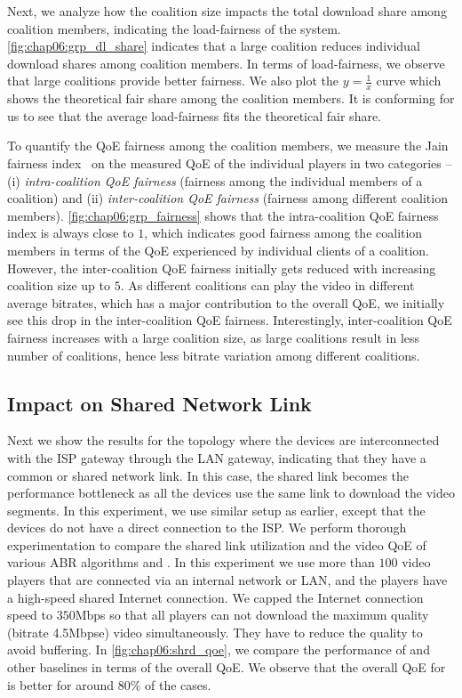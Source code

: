 Next, we analyze how the coalition size impacts the total download share among coalition members, indicating the load-fairness of the system. \fig\ref{fig:chap06:grp_dl_share} indicates that a large coalition reduces individual download shares among coalition members. In terms of load-fairness, we observe that large coalitions provide better fairness. We also plot the $y=\frac{1}{x}$ curve which shows the theoretical fair share among the coalition members. It is conforming for us to see that the average load-fairness fits the theoretical fair share. 

To quantify the \ac{QoE} fairness among the coalition members, we measure the Jain fairness index~\cite{jain1999throughput} on the measured \ac{QoE} of the individual players in two categories -- (i) \textit{intra-coalition \acs{QoE} fairness} (fairness among the individual members of a coalition) and (ii) \textit{inter-coalition \acs{QoE} fairness} (fairness among different coalition members). \fig\ref{fig:chap06:grp_fairness} shows that the intra-coalition \ac{QoE} fairness index is always close to $1$, which indicates good fairness among the coalition members in terms of the \ac{QoE} experienced by individual clients of a coalition. However, the inter-coalition \ac{QoE} fairness initially gets reduced with increasing coalition size up to $5$. As different coalitions can play the video in different average bitrates, which has a major contribution to the overall \ac{QoE}, we initially see this drop in the inter-coalition \ac{QoE} fairness. Interestingly, inter-coalition \ac{QoE} fairness increases with a large coalition size, as large coalitions result in less number of coalitions, hence less bitrate variation among different coalitions.

\subsection{Impact on Shared Network Link}
Next we show the results for the topology where the devices are interconnected with the \ac{ISP} gateway through the \ac{LAN} gateway, indicating that they have a common or shared network link. In this case, the shared link becomes the performance bottleneck as all the devices use the same link to download the video segments. In this experiment, we use similar setup as earlier, except that the devices do not have a direct connection to the \ac{ISP}. We perform thorough experimentation to compare the shared link utilization and the video \ac{QoE} of various \ac{ABR} algorithms and \our. In this experiment we use more than $100$ video players that are connected via an internal network or \ac{LAN}, and the players have a high-speed shared Internet connection. We capped the Internet connection speed to $350$Mbps so that all players can not download the maximum quality (bitrate 4.5Mbpse) video simultaneously. They have to reduce the quality to avoid buffering. In \fig\ref{fig:chap06:shrd_qoe}, we compare the performance of {\our} and other baselines in terms of the overall \ac{QoE}. We observe that the overall \ac{QoE} for {\our} is better for around $80\%$ of the cases.

